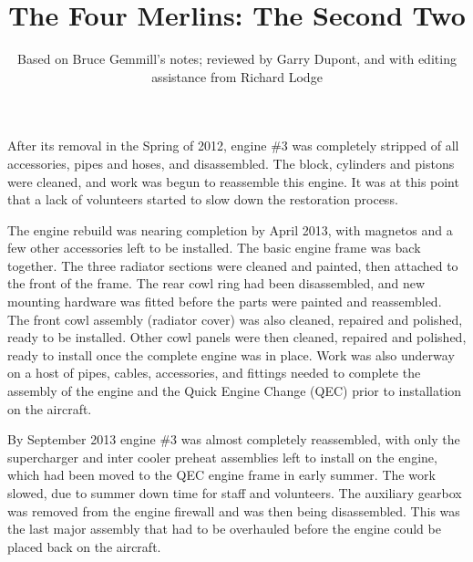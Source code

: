 %


\title{The Four Merlins: The Second Two}
\author{Based on Bruce Gemmill's notes; reviewed by Garry Dupont, and with editing assistance from Richard Lodge}

\maketitle


After its removal in the Spring of 2012, engine \#3 was completely stripped of
all accessories, pipes and hoses, and disassembled.  The block, cylinders and
pistons were cleaned, and work was begun to reassemble this engine.  It was at
this point that a lack of volunteers started to slow down the restoration
process.

The engine rebuild was nearing completion by April 2013, with magnetos and a few
other accessories left to be installed.  The basic engine frame was back
together.  The three radiator sections were cleaned and painted, then attached
to the front of the frame.  The rear cowl ring had been disassembled, and new
mounting hardware was fitted before the parts were painted and reassembled.  The
front cowl assembly (radiator cover) was also cleaned, repaired and polished,
ready to be installed.  Other cowl panels were then cleaned, repaired and
polished, ready to install once the complete engine was in place.  Work was also
underway on a host of pipes, cables, accessories, and fittings needed to
complete the assembly of the engine and the Quick Engine Change (QEC) prior to
installation on the aircraft.

By September 2013 engine \#3 was almost completely reassembled, with only the
supercharger and inter cooler preheat assemblies left to install on the engine,
which had been moved to the QEC engine frame in early summer.  The work slowed,
due to summer down time for staff and volunteers. The auxiliary gearbox was
removed from the engine firewall and was then being disassembled.  This was the
last major assembly that had to be overhauled before the engine could be placed
back on the aircraft.

